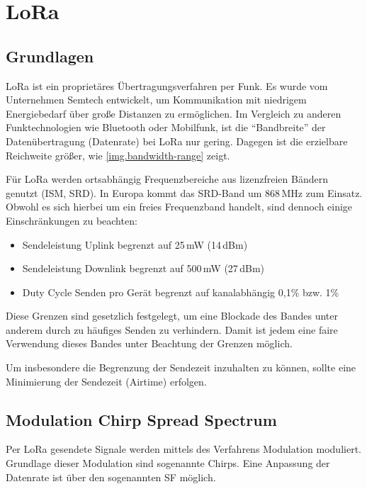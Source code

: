 \chapter{LoRa}\label{chp.lora}



\section{Grundlagen}\label{sec.lora.basics}
LoRa ist ein proprietäres Übertragungsverfahren per Funk.
Es wurde vom Unternehmen Semtech entwickelt, um Kommunikation mit niedrigem Energiebedarf über große Distanzen zu ermöglichen.
Im Vergleich zu anderen Funktechnologien wie Bluetooth oder Mobilfunk, ist die "`Bandbreite"' der Datenübertragung (Datenrate) bei LoRa nur gering.
Dagegen ist die erzielbare Reichweite größer, wie \autoref{img.bandwidth-range} zeigt.
\cite{semtech}


Für LoRa werden ortsabhängig Frequenzbereiche aus lizenzfreien Bändern genutzt (\gls{ISM}, \gls{SRD}).
In Europa kommt das SRD-Band um 868\,MHz zum Einsatz.\cite{loraparameter}
Obwohl es sich hierbei um ein freies Frequenzband handelt, sind dennoch einige Einschränkungen zu beachten:\cite{lorabasics}
\begin{itemize}\singlespacing\setlength\itemsep{-0.2em}
\item Sendeleistung \gls{Uplink} begrenzt auf 25\,mW (14\,dBm)
\item Sendeleistung \gls{Downlink} begrenzt auf 500\,mW (27\,dBm)
\item Duty Cycle Senden pro Gerät begrenzt auf kanalabhängig 0,1\% bzw. 1\%
\end{itemize}
Diese Grenzen sind gesetzlich festgelegt, um eine Blockade des Bandes unter anderem durch zu häufiges Senden zu verhindern.
Damit ist jedem eine faire Verwendung dieses Bandes unter Beachtung der Grenzen möglich.

Um insbesondere die Begrenzung der Sendezeit inzuhalten zu können, sollte eine Minimierung der Sendezeit (\gls{Airtime}) erfolgen.



\section{Modulation Chirp Spread Spectrum }\label{sec.lora.modulation}
Per LoRa gesendete Signale werden mittels des Verfahrens \gls{Modulation} moduliert.
Grundlage dieser Modulation sind sogenannte \glspl{Chirp}.
Eine Anpassung der Datenrate ist über den sogenannten \gls{SF} möglich.


